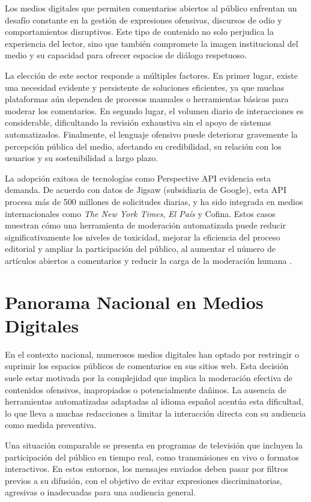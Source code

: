 Los medios digitales que permiten comentarios abiertos al público enfrentan un desafío constante en la gestión de expresiones ofensivas, discursos de odio y comportamientos disruptivos. Este tipo de contenido no solo perjudica la experiencia del lector, sino que también compromete la imagen institucional del medio y su capacidad para ofrecer espacios de diálogo respetuoso.

La elección de este sector responde a múltiples factores. En primer lugar, existe una necesidad evidente y persistente de soluciones eficientes, ya que muchas plataformas aún dependen de procesos manuales o herramientas básicas para moderar los comentarios. En segundo lugar, el volumen diario de interacciones es considerable, dificultando la revisión exhaustiva sin el apoyo de sistemas automatizados. Finalmente, el lenguaje ofensivo puede deteriorar gravemente la percepción pública del medio, afectando su credibilidad, su relación con los usuarios y su sostenibilidad a largo plazo.

La adopción exitosa de tecnologías como Perspective API evidencia esta demanda. De acuerdo con datos de Jigsaw (subsidiaria de Google), esta API procesa más de 500 millones de solicitudes diarias, y ha sido integrada en medios internacionales como \textit{The New York Times}, \textit{El País} y Cofina. Estos casos muestran cómo una herramienta de moderación automatizada puede reducir significativamente los niveles de toxicidad, mejorar la eficiencia del proceso editorial y ampliar la participación del público, al aumentar el número de artículos abiertos a comentarios y reducir la carga de la moderación humana \cite{jigsaw2021api}.

\section{Panorama Nacional en Medios Digitales}

En el contexto nacional, numerosos medios digitales han optado por restringir o suprimir los espacios públicos de comentarios en sus sitios web. Esta decisión suele estar motivada por la complejidad que implica la moderación efectiva de contenidos ofensivos, inapropiados o potencialmente dañinos. La ausencia de herramientas automatizadas adaptadas al idioma español acentúa esta dificultad, lo que lleva a muchas redacciones a limitar la interacción directa con su audiencia como medida preventiva.

Una situación comparable se presenta en programas de televisión que incluyen la participación del público en tiempo real, como transmisiones en vivo o formatos interactivos. En estos entornos, los mensajes enviados deben pasar por filtros previos a su difusión, con el objetivo de evitar expresiones discriminatorias, agresivas o inadecuadas para una audiencia general.




